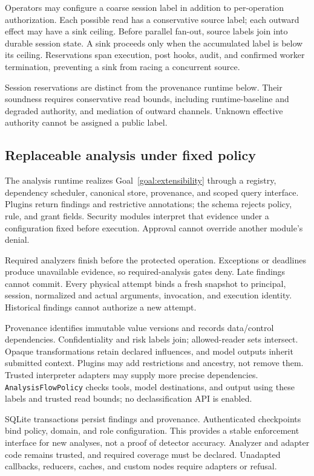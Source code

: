 \documentclass[letterpaper,twocolumn,10pt]{article}
\newcommand{\code}[1]{\texttt{#1}}
\begin{document}
Operators may configure a coarse session label in addition to per-operation
authorization. Each possible read has a conservative source label; each outward
effect may have a sink ceiling. Before parallel fan-out, source labels join into
durable session state. A sink proceeds only when the accumulated label is below
its ceiling. Reservations span execution, post hooks, audit, and confirmed
worker termination, preventing a sink from racing a concurrent source.

Session reservations are distinct from the provenance runtime below. Their
soundness requires conservative read bounds, including runtime-baseline and
degraded authority, and mediation of outward channels. Unknown effective
authority cannot be assigned a public label.

\subsection{Replaceable analysis under fixed policy}
\label{sec:analysis}

The analysis runtime realizes Goal~\ref{goal:extensibility} through a registry,
dependency scheduler, canonical store, provenance, and scoped query interface.
Plugins return findings and restrictive
annotations; the schema rejects policy, rule, and grant fields. Security modules
interpret that evidence under a configuration fixed before execution. Approval
cannot override another module's denial.

Required analyzers finish before the protected operation. Exceptions or deadlines
produce unavailable evidence, so required-analysis gates deny. Late findings
cannot commit. Every physical attempt binds a fresh snapshot to principal,
session, normalized and actual arguments, invocation, and execution identity.
Historical findings cannot authorize a new attempt.

Provenance identifies immutable value versions and records data/control
dependencies. Confidentiality and risk labels join; allowed-reader sets
intersect. Opaque transformations retain declared influences, and model outputs
inherit submitted context. Plugins may add restrictions and ancestry, not
remove them. Trusted interpreter adapters may supply more precise dependencies.
\code{AnalysisFlowPolicy} checks tools, model destinations, and output using
these labels and trusted read bounds; no declassification API is enabled.

SQLite transactions persist findings and provenance. Authenticated checkpoints
bind policy, domain, and role configuration. This provides a stable enforcement
interface for new analyses, not a proof of detector accuracy. Analyzer and
adapter code remains trusted, and required coverage must be declared. Unadapted
callbacks, reducers, caches, and custom nodes require adapters or refusal.
\end{document}
